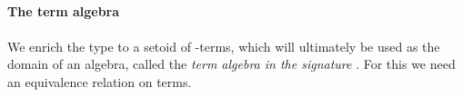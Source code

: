 \begin{code}%
\>[0]\<%
\\
\>[0]\AgdaSpace{}%
\AgdaSpace{}%
\AgdaSymbol{(}\AgdaSpace{}%
\AgdaSymbol{:}\AgdaSpace{}%
\AgdaSpace{}%
\AgdaSpace{}%
\AgdaSymbol{)}\AgdaSpace{}%
\AgdaSymbol{:}\AgdaSpace{}%
\AgdaSpace{}%
\AgdaSymbol{(}\AgdaSpace{}%
\AgdaSymbol{)}%
\>[39]\<%
\\
\>[0][@{}l@{\AgdaIndent{0}}]%
\>[1]\AgdaSpace{}%
\AgdaSymbol{:}\AgdaSpace{}%
\AgdaSpace{}%
\AgdaSpace{}%
\AgdaSpace{}%
\<%
\\
%
\>[1]\AgdaSpace{}%
\AgdaSymbol{:}\AgdaSpace{}%
\AgdaSymbol{(}\AgdaSpace{}%
\AgdaSymbol{:}\AgdaSpace{}%
\AgdaSpace{}%
\AgdaSpace{}%
\AgdaSymbol{)(}\AgdaSpace{}%
\AgdaSymbol{:}\AgdaSpace{}%
\AgdaSpace{}%
\AgdaSpace{}%
\AgdaSpace{}%
\AgdaSpace{}%
\AgdaSpace{}%
\AgdaSpace{}%
\AgdaSymbol{)}\AgdaSpace{}%
\AgdaSpace{}%
\AgdaSpace{}%
\<%
\end{code}

\paragraph*{The term algebra}
We enrich the  type to a setoid of  -terms, which will ultimately
be used as the domain of an algebra, called the \emph{term algebra in the signature} .
For this we need an equivalence relation on terms.


